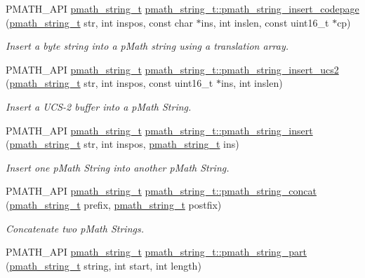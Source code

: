 \begin{CompactItemize}
PMATH\_\-API \hyperlink{classpmath__string__t}{pmath\_\-string\_\-t} \hyperlink{group__strings_g5008b0b2e682b283772e10bf38666ffe}{pmath\_\-string\_\-t::pmath\_\-string\_\-insert\_\-codepage} (\hyperlink{classpmath__string__t}{pmath\_\-string\_\-t} str, int inspos, const char $\ast$ins, int inslen, const uint16\_\-t $\ast$cp)
\begin{CompactList}\small\item\em Insert a byte string into a pMath string using a translation array. \item\end{CompactList}\item 
PMATH\_\-API \hyperlink{classpmath__string__t}{pmath\_\-string\_\-t} \hyperlink{group__strings_ge49ea36d0f35856b6b9aeb0c4470c614}{pmath\_\-string\_\-t::pmath\_\-string\_\-insert\_\-ucs2} (\hyperlink{classpmath__string__t}{pmath\_\-string\_\-t} str, int inspos, const uint16\_\-t $\ast$ins, int inslen)
\begin{CompactList}\small\item\em Insert a UCS-2 buffer into a pMath String. \item\end{CompactList}\item 
PMATH\_\-API \hyperlink{classpmath__string__t}{pmath\_\-string\_\-t} \hyperlink{group__strings_g563af717f21793d72933a9914b23a6aa}{pmath\_\-string\_\-t::pmath\_\-string\_\-insert} (\hyperlink{classpmath__string__t}{pmath\_\-string\_\-t} str, int inspos, \hyperlink{classpmath__string__t}{pmath\_\-string\_\-t} ins)
\begin{CompactList}\small\item\em Insert one pMath String into another pMath String. \item\end{CompactList}\item 
PMATH\_\-API \hyperlink{classpmath__string__t}{pmath\_\-string\_\-t} \hyperlink{group__strings_g2594ada00fefcbede1420bf19b806de6}{pmath\_\-string\_\-t::pmath\_\-string\_\-concat} (\hyperlink{classpmath__string__t}{pmath\_\-string\_\-t} prefix, \hyperlink{classpmath__string__t}{pmath\_\-string\_\-t} postfix)
\begin{CompactList}\small\item\em Concatenate two pMath Strings. \item\end{CompactList}\item 
PMATH\_\-API \hyperlink{classpmath__string__t}{pmath\_\-string\_\-t} \hyperlink{group__strings_gb99f797d2a7670ff6a44d788d07812cd}{pmath\_\-string\_\-t::pmath\_\-string\_\-part} (\hyperlink{classpmath__string__t}{pmath\_\-string\_\-t} string, int start, int length)

\end{CompactItemize}
